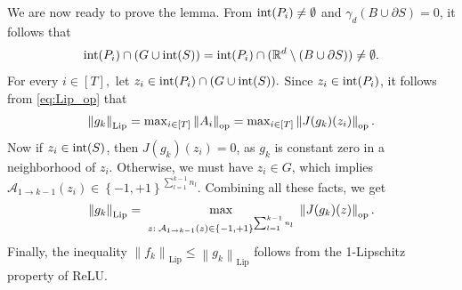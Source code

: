 \documentclass[11pt]{article}
\def\RR{\mathbb{R}}
\def\Set#1{\left\{ #1 \right\}}
\newcommand{\norm}[1]{\left\|#1\right\|}
\def\Lip{\mathrm{Lip}}
\def\op{\mathrm{op}}
\def\interior{\mathop{\rm int}\nolimits}
\def\max{\mathop{\rm max}\nolimits}
\begin{document}
    We are now ready to prove the lemma.
    From $\interior(P_i)\neq\emptyset$ and $\gamma_d(B\cup\partial S)=0$,
    it follows that
    \begin{align*}
	\interior(P_i)\cap (G\cup\interior(S))
	=\interior(P_i)\cap (\RR^d\setminus (B\cup\partial S))
	\neq\emptyset .
    \end{align*}
    For every $i\in[T],$ let $z_i\in \interior(P_i)\cap (G\cup\interior(S)).$
    Since $z_i\in\interior(P_i)$, it follows from \eqref{eq:Lip_op} that
    \begin{align*}
	\norm{g_k}_{\Lip} 
	=\max_{i\in[T]} \norm{A_i}_{\op}
	=\max_{i\in[T]} \norm{J(g_k)(z_i)}_{\op} .
    \end{align*}
    Now if $z_i\in\interior(S)$, then $J(g_k)(z_i)=0$, as $g_k$ is constant zero in a neighborhood of $z_i.$
    Otherwise, we must have $z_i\in G$, which implies $\mathcal{A}_{1\to k-1}(z_i)\in\Set{-1,+1}^{\sum_{l=1}^{k-1}n_l}.$
    Combining all these facts, we get
    \begin{align*}
	\norm{g_k}_{\Lip}
	=\;\max\limits_{z:\; \mathcal{A}_{1\to k-1}(z)\in\Set{-1,+1}^{\sum_{l=1}^{k-1}n_l}}\; \norm{J(g_k)(z)}_{\op} .
    \end{align*}
    Finally, the inequality $\norm{f_k}_{\Lip}\leq\norm{g_k}_{\Lip}$ follows from the 1-Lipschitz property of ReLU.
\end{document}
